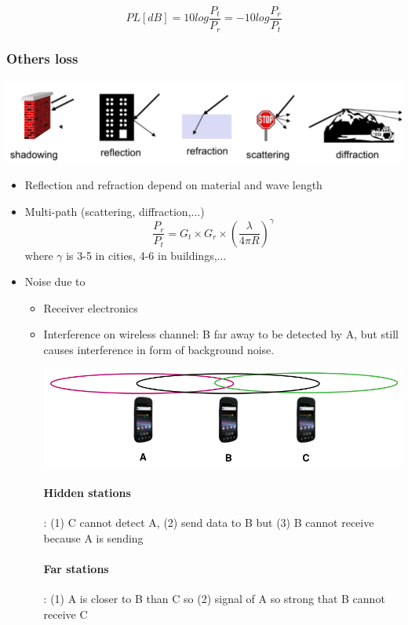 $$PL[dB] = 10 log\frac{P_t}{P_r} = - 10 log\frac{P_r}{P_t}$$

\subsubsection{Others loss}
\begin{center}
    \includegraphics[width=0.7\linewidth]{img/loss.png}
\end{center}

\begin{itemize}
    \item Reflection and refraction depend on material and wave
        length
    \item Multi-path (scattering, diffraction,...)
        $$\frac{P_r}{P_t} = G_t \times G_r \times ( \frac{\lambda}{4\pi
        R})^\gamma$$
        where $\gamma$ is 3-5 in cities, 4-6 in buildings,...
    \item Noise due to
        \begin{itemize}
            \item Receiver electronics
            \item Interference on wireless channel:
                B far away to be detected by A, but still causes
                interference in form of background noise.
                \begin{center}
                    \includegraphics[width=0.5\linewidth]{img/ranges.png}
                \end{center}

                \paragraph{Hidden stations}: (1) C cannot detect A, (2) send data to B
                but (3) B cannot receive because A is sending
                \paragraph{Far stations}: (1) A is closer to B than C so
                (2) signal of A so strong that B cannot receive C
        \end{itemize}


\end{itemize}

